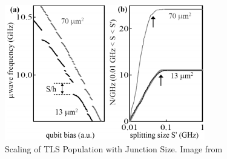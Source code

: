 \documentclass[aps,prl,reprint,groupedaddress]{revtex4-1}
\begin{document}
\begin{figure}%
\includegraphics[width=1.4\columnwidth, natwidth=330,natheight=223]{../JunctionSize.png}%
\caption{Scaling of TLS Population with Junction Size. Image from \cite{martinis_decoherence_2005}}%
\label{JunSize}%
\end{figure}
\end{document}
